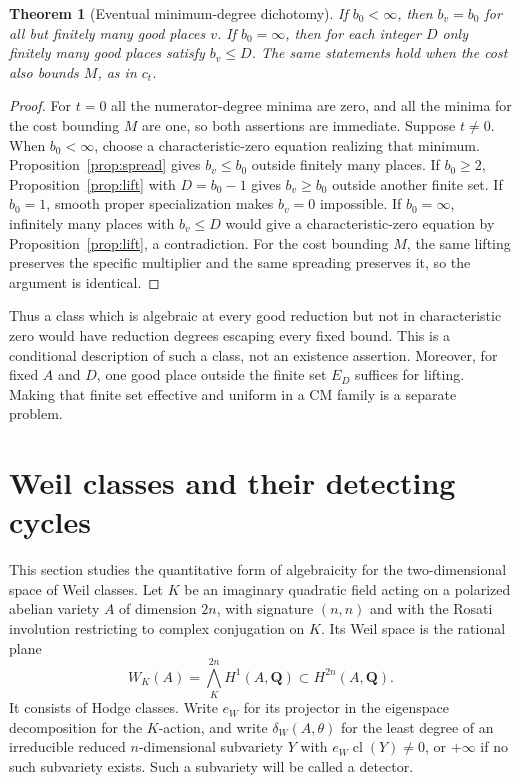\documentclass[11pt]{article}
\newtheorem{theorem}{Theorem}[section]
\theoremstyle{definition}
\theoremstyle{remark}
\newcommand{\Q}{\mathbf Q}
\newcommand{\cl}{\operatorname{cl}}
\begin{document}
\begin{theorem}[Eventual minimum-degree dichotomy]\label{thm:ghosts}
If $b_0<\infty$, then $b_v=b_0$ for all but finitely many good places $v$. If $b_0=\infty$, then for each integer $D$ only finitely many good places satisfy $b_v\leq D$. The same statements hold when the cost also bounds $M$, as in $c_t$.
\end{theorem}

\begin{proof}
For $t=0$ all the numerator-degree minima are zero, and all the minima for the cost bounding $M$ are one, so both assertions are immediate. Suppose $t\ne0$. When $b_0<\infty$, choose a characteristic-zero equation realizing that minimum. Proposition~\ref{prop:spread} gives $b_v\leq b_0$ outside finitely many places. If $b_0\geq2$, Proposition~\ref{prop:lift} with $D=b_0-1$ gives $b_v\geq b_0$ outside another finite set. If $b_0=1$, smooth proper specialization makes $b_v=0$ impossible. If $b_0=\infty$, infinitely many places with $b_v\leq D$ would give a characteristic-zero equation by Proposition~\ref{prop:lift}, a contradiction. For the cost bounding $M$, the same lifting preserves the specific multiplier and the same spreading preserves it, so the argument is identical.
\end{proof}

Thus a class which is algebraic at every good reduction but not in characteristic zero would have reduction degrees escaping every fixed bound. This is a conditional description of such a class, not an existence assertion. Moreover, for fixed $A$ and $D$, one good place outside the finite set $E_D$ suffices for lifting. Making that finite set effective and uniform in a CM family is a separate problem.

\section{Weil classes and their detecting cycles}
\label{sec:weil}
This section studies the quantitative form of algebraicity for the two-dimensional space of Weil classes. Let $K$ be an imaginary quadratic field acting on a polarized abelian variety $A$ of dimension $2n$, with signature $(n,n)$ and with the Rosati involution restricting to complex conjugation on $K$. Its Weil space is the rational plane
\[
 W_K(A)=\bigwedge_K^{2n}H^1(A,\Q)\subset H^{2n}(A,\Q).
\]
It consists of Hodge classes. Write $e_W$ for its projector in the eigenspace decomposition for the $K$-action, and write $\delta_W(A,\theta)$ for the least degree of an irreducible reduced $n$-dimensional subvariety $Y$ with $e_W\cl(Y)\ne0$, or $+\infty$ if no such subvariety exists. Such a subvariety will be called a detector.
\end{document}
